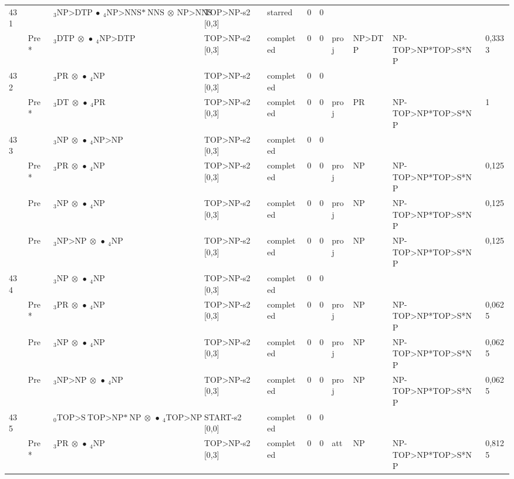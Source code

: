 \documentclass[10pt]{article}
\begin{document}
\begin{longtable}[htbp]{lllllllllll}
431 & & $ {}_3 \textrm{NP>DTP} \  \bullet \ {}_{4} \textrm{NP>NNS*} \ \textrm{NNS} \  \otimes \ \textrm{NP>NNS} $ & TOP>NP-s2 [0,3] & starred & 0 & 0 & & & & \\ 
 & Pre *& $ {}_3 \textrm{DTP} \  \otimes \  \bullet \ {}_{4} \textrm{NP>DTP} $ & TOP>NP-s2 [0,3] & completed & 0 & 0 & proj & NP>DTP & NP-TOP>NP*TOP>S*NP & 0,3333 \\ 
432 & & $ {}_3 \textrm{PR} \  \otimes \  \bullet \ {}_{4} \textrm{NP} $ & TOP>NP-s2 [0,3] & completed & 0 & 0 & & & & \\ 
 & Pre *& $ {}_3 \textrm{DT} \  \otimes \  \bullet \ {}_{4} \textrm{PR} $ & TOP>NP-s2 [0,3] & completed & 0 & 0 & proj & PR & NP-TOP>NP*TOP>S*NP & 1 \\ 
433 & & $ {}_3 \textrm{NP} \  \otimes \  \bullet \ {}_{4} \textrm{NP>NP} $ & TOP>NP-s2 [0,3] & completed & 0 & 0 & & & & \\ 
 & Pre *& $ {}_3 \textrm{PR} \  \otimes \  \bullet \ {}_{4} \textrm{NP} $ & TOP>NP-s2 [0,3] & completed & 0 & 0 & proj & NP & NP-TOP>NP*TOP>S*NP & 0,125 \\ 
 & Pre & $ {}_3 \textrm{NP} \  \otimes \  \bullet \ {}_{4} \textrm{NP} $ & TOP>NP-s2 [0,3] & completed & 0 & 0 & proj & NP & NP-TOP>NP*TOP>S*NP & 0,125 \\ 
 & Pre & $ {}_3 \textrm{NP>NP} \  \otimes \  \bullet \ {}_{4} \textrm{NP} $ & TOP>NP-s2 [0,3] & completed & 0 & 0 & proj & NP & NP-TOP>NP*TOP>S*NP & 0,125 \\ 
434 & & $ {}_3 \textrm{NP} \  \otimes \  \bullet \ {}_{4} \textrm{NP} $ & TOP>NP-s2 [0,3] & completed & 0 & 0 & & & & \\ 
 & Pre *& $ {}_3 \textrm{PR} \  \otimes \  \bullet \ {}_{4} \textrm{NP} $ & TOP>NP-s2 [0,3] & completed & 0 & 0 & proj & NP & NP-TOP>NP*TOP>S*NP & 0,0625 \\ 
 & Pre & $ {}_3 \textrm{NP} \  \otimes \  \bullet \ {}_{4} \textrm{NP} $ & TOP>NP-s2 [0,3] & completed & 0 & 0 & proj & NP & NP-TOP>NP*TOP>S*NP & 0,0625 \\ 
 & Pre & $ {}_3 \textrm{NP>NP} \  \otimes \  \bullet \ {}_{4} \textrm{NP} $ & TOP>NP-s2 [0,3] & completed & 0 & 0 & proj & NP & NP-TOP>NP*TOP>S*NP & 0,0625 \\ 
435 & & $ {}_0 \textrm{TOP>S} \ \textrm{TOP>NP*} \ \textrm{NP} \  \otimes \  \bullet \ {}_{4} \textrm{TOP>NP} $ & START-s2 [0,0] & completed & 0 & 0 & & & & \\ 
 & Pre *& $ {}_3 \textrm{PR} \  \otimes \  \bullet \ {}_{4} \textrm{NP} $ & TOP>NP-s2 [0,3] & completed & 0 & 0 & att & NP & NP-TOP>NP*TOP>S*NP & 0,8125 \\ 

\end{longtable}
\end{document}
